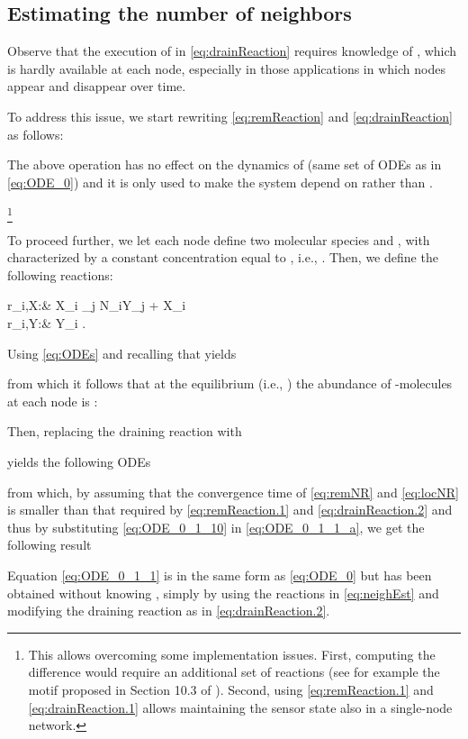 \documentclass[journal]{IEEEtran}
\newcommand{\mol}[1]{\ensuremath{\textrm{#1}}}
\begin{document}
\subsection{Estimating the number of neighbors}
{Observe that the execution of  in \eqref{eq:drainReaction} requires knowledge of , which is hardly available at each node, especially in those applications in which nodes appear and disappear over time.} 
{To address this issue,
we start rewriting \eqref{eq:remReaction} and \eqref{eq:drainReaction} as follows:

The above operation has no effect on the dynamics of  (same set of ODEs as in \eqref{eq:ODE_0}) and it is only used to make the system depend on  rather than .}\footnote{{This allows overcoming some implementation issues. First, computing the difference  would require an additional set of reactions (see for example the motif proposed in Section 10.3 of \cite{MeTh}). Second, using \eqref{eq:remReaction.1} and \eqref{eq:drainReaction.1} allows maintaining the sensor state also in a single-node network.}}
{To proceed further, we let each node  define two molecular species  and , with  characterized by a constant concentration equal to , i.e., {}. Then, we define the following reactions:
 
\label{eq:remNR}
	r_{i,X}:&  \quad \mol{X}_i  \sum_{j \in \mathcal N_i}\mol{Y}_j + \mol{X}_i  \\  	\label{eq:locNR}
	r_{i,Y}:&  \quad \mol{Y}_i  \emptyset.
 
Using \eqref{eq:ODEs} and recalling that  yields

from which it follows that at the equilibrium (i.e., ) the abundance of -molecules at each node is :

Then, replacing the draining reaction  with

yields the following ODEs

from which, by assuming that the convergence time of \eqref{eq:remNR} and \eqref{eq:locNR} is smaller than that required by \eqref{eq:remReaction.1} and \eqref{eq:drainReaction.2} and thus by substituting \eqref{eq:ODE_0_1_10} in \eqref{eq:ODE_0_1_1_a}, we get the following result
 
Equation \eqref{eq:ODE_0_1_1} is in the same form as \eqref{eq:ODE_0} but has been obtained without knowing , simply by using the reactions in \eqref{eq:neighEst} and modifying the draining reaction as in \eqref{eq:drainReaction.2}.}
\end{document}
